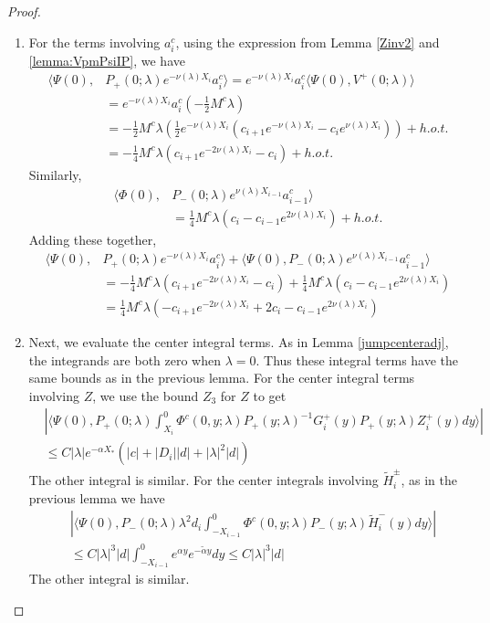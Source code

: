 \documentclass[thesis.tex]{subfiles}
\begin{document}
\begin{lemma}
\begin{proof}
\begin{enumerate}
\item For the terms involving $a_i^c$, using the expression from Lemma \ref{Zinv2} and \cref{lemma:VpmPsiIP}, we have
\begin{align*}
\langle \Psi(0), &P_+(0; \lambda) e^{-\nu(\lambda)X_i} a_i^c \rangle = e^{-\nu(\lambda)X_i} a_i^c \langle \Psi(0), V^+(0; \lambda) \rangle \\
&= e^{-\nu(\lambda)X_i} a_i^c \left( -\frac{1}{2} M^c \lambda \right) \\
&= -\frac{1}{2} M^c \lambda \left( \frac{1}{2}e^{-\nu(\lambda)X_i} \left( c_{i+1} e^{-\nu(\lambda)X_i} - c_i e^{\nu(\lambda)X_i} \right)\right) + h.o.t.\\
&= -\frac{1}{4} M^c \lambda \left( c_{i+1} e^{-2 \nu(\lambda)X_i} - c_i \right) + h.o.t.
\end{align*}
Similarly, 
\begin{align*}
\langle \Phi(0), &P_-(0; \lambda) e^{\nu(\lambda) X_{i-1}} a_{i-1}^c \rangle \\
&= \frac{1}{4} M^c \lambda \left( c_i - c_{i-1} e^{2 \nu(\lambda)X_i} \right) + h.o.t. 
\end{align*}
Adding these together,
\begin{align*}
\langle \Psi(0), &P_+(0; \lambda) e^{-\nu(\lambda)X_i} a_i^c \rangle + \langle \Psi(0), P_-(0; \lambda) e^{\nu(\lambda) X_{i-1}} a_{i-1}^c \rangle \\
&= -\frac{1}{4} M^c \lambda \left( c_{i+1} e^{-2 \nu(\lambda)X_i} - c_i \right) + \frac{1}{4} M^c \lambda \left( c_i - c_{i-1} e^{2 \nu(\lambda)X_i} \right) \\
&= \frac{1}{4} M^c \lambda \left( - c_{i+1} e^{-2 \nu(\lambda)X_i} + 2 c_i - c_{i-1} e^{2 \nu(\lambda)X_i} \right) 
\end{align*}

\item Next, we evaluate the center integral terms. As in Lemma \ref{jumpcenteradj}, the integrands are both zero when $\lambda = 0$. Thus these integral terms have the same bounds as in the previous lemma. For the center integral terms involving $Z$, we use the bound $Z_3$ for $Z$ to get
\begin{align*}
&\left| \langle \Psi(0), P_+(0; \lambda) \int_{X_i}^0 \Phi^c(0, y; \lambda) P_+(y; \lambda)^{-1} G_i^+(y) P_+(y; \lambda) Z_i^+(y) dy \rangle \right| \\
&\leq C |\lambda| e^{-\alpha X_*}\left(|c| + |D_i||d| + |\lambda|^2|d|\right)
\end{align*}
The other integral is similar. For the center integrals involving $\tilde{H}_i^\pm$, as in the previous lemma we have
\begin{align*}
&\left| \langle \Psi(0), P_-(0; \lambda) \lambda^2 d_i \int_{-X_{i-1}}^0 \Phi^c(0, y; \lambda) P_-(y; \lambda) \tilde{H}_i^-(y) dy \rangle \right| \\
&\leq C |\lambda|^3 |d| \int_{-X_{i-1}}^0 e^{\alpha y} e^{-\tilde{\alpha} y} dy \leq C |\lambda|^3 |d| 
\end{align*}
The other integral is similar.


\end{enumerate}
\end{proof}
\end{lemma}
\end{document}
